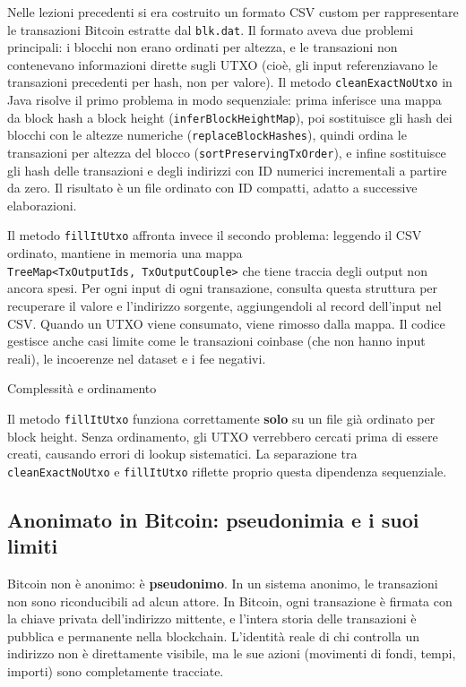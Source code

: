 \documentclass[
  italian,
  openany]{book}
\begin{document}
Nelle lezioni precedenti si era costruito un formato CSV custom per
rappresentare le transazioni Bitcoin estratte dal \texttt{blk.dat}. Il
formato aveva due problemi principali: i blocchi non erano ordinati per
altezza, e le transazioni non contenevano informazioni dirette sugli
UTXO (cioè, gli input referenziavano le transazioni precedenti per hash,
non per valore). Il metodo \texttt{cleanExactNoUtxo} in Java risolve il
primo problema in modo sequenziale: prima inferisce una mappa da block
hash a block height (\texttt{inferBlockHeightMap}), poi sostituisce gli
hash dei blocchi con le altezze numeriche (\texttt{replaceBlockHashes}),
quindi ordina le transazioni per altezza del blocco
(\texttt{sortPreservingTxOrder}), e infine sostituisce gli hash delle
transazioni e degli indirizzi con ID numerici incrementali a partire da
zero. Il risultato è un file ordinato con ID compatti, adatto a
successive elaborazioni.

Il metodo \texttt{fillItUtxo} affronta invece il secondo problema:
leggendo il CSV ordinato, mantiene in memoria una mappa
\texttt{TreeMap\textless{}TxOutputIds,\ TxOutputCouple\textgreater{}}
che tiene traccia degli output non ancora spesi. Per ogni input di ogni
transazione, consulta questa struttura per recuperare il valore e
l'indirizzo sorgente, aggiungendoli al record dell'input nel CSV. Quando
un UTXO viene consumato, viene rimosso dalla mappa. Il codice gestisce
anche casi limite come le transazioni coinbase (che non hanno input
reali), le incoerenze nel dataset e i fee negativi.

\begin{calloutwarning}{Complessità e ordinamento}

Il metodo \texttt{fillItUtxo} funziona correttamente \textbf{solo} su un
file già ordinato per block height. Senza ordinamento, gli UTXO
verrebbero cercati prima di essere creati, causando errori di lookup
sistematici. La separazione tra \texttt{cleanExactNoUtxo} e
\texttt{fillItUtxo} riflette proprio questa dipendenza sequenziale.

\end{calloutwarning}

\subsection{Anonimato in Bitcoin: pseudonimia e i suoi
limiti}\label{anonimato-in-bitcoin-pseudonimia-e-i-suoi-limiti}

Bitcoin non è anonimo: è \textbf{pseudonimo}. In un sistema anonimo, le
transazioni non sono riconducibili ad alcun attore. In Bitcoin, ogni
transazione è firmata con la chiave privata dell'indirizzo mittente, e
l'intera storia delle transazioni è pubblica e permanente nella
blockchain. L'identità reale di chi controlla un indirizzo non è
direttamente visibile, ma le sue azioni (movimenti di fondi, tempi,
importi) sono completamente tracciate.
\end{document}
